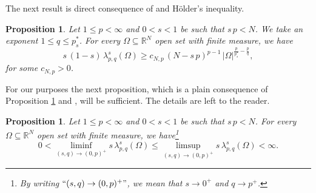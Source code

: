 \documentclass{amsart}
\newtheorem{proposition}[theorem]{Proposition}
\theoremstyle{definition}
\numberwithin{equation}{section}
\begin{document}
The next  result is direct consequence of \cite[Theorem 1]{MazShap} and H\"older's inequality.  
\begin{proposition}\label{prop:positività-autovalori}
	Let $1\le p <\infty$ and $0<s<1$ be such that $s\,p<N$. We take an exponent $1 \le q \le p^*_s$. For every $\Omega \subseteq \mathbb{R}^N$ open set with finite measure, we have \begin{equation*}\label{eigenvalue_subcritical_lowerbound}
		s\,(1-s)\,\lambda_{p, q}^s\left(\Omega\right) \geq c_{N,p}\,\left(N-s\,p\right)^{p-1}\,|\Omega|^{\frac{p}{p^*_s}-\frac{p}{q}}, 
	\end{equation*}
	for some $c_{N,p} > 0$.
\end{proposition}

For our purposes the next proposition, which is a plain consequence of Proposition \ref{prop:positività-autovalori} and \cite[Theorem 3]{MazShap}, will be sufficient. The details are left to the reader.
\begin{proposition} \label{prop:asym2}
	Let $1 \le p < \infty$ and $0 < s <1$ be such that $s\,p < N$. For every $\Omega\subseteq\mathbb{R}^N$ open set with finite measure, we have\footnote{By writing $``(s,q) \to (0, p)^{+}"$, we mean that $s \to 0^{+}$ and $q \to p^{+}$.} 
	\[
	0 < \liminf_{(s,q) \to (0, p)^{+}} s\,\lambda_{p, q}^s(\Omega) \le \limsup_{(s,q) \to (0, p)^{+}} s\,\lambda_{p, q}^s(\Omega) < \infty.
	\]
\end{proposition}
\end{document}
